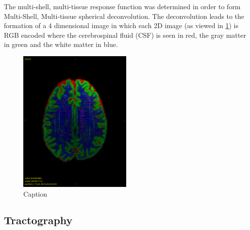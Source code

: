 \documentclass[msthesis.tex]{subfiles}
\begin{document}
The multi-shell, multi-tissue response function was determined  in order to form Multi-Shell, Multi-tissue spherical deconvolution. The deconvolution leads to the formation of a 4 dimensional image in which each 2D image (as viewed in \ref{fig:tissueRGB}) is RGB encoded where the cerebrospinal fluid (CSF) is seen in red, the gray matter in green and the white matter in blue. 

\begin{figure}
    \centering
    \includegraphics[width=0.5\textwidth]{images/tissueRGB0003.png}
    \caption{Caption}
    \label{fig:tissueRGB}
\end{figure}
\subsection{Tractography}
\end{document}

